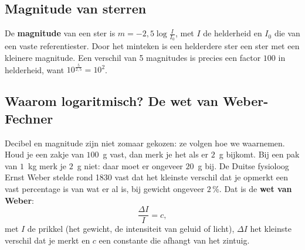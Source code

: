 \subsection{Magnitude van sterren}

De \textbf{magnitude} van een ster is $m = -2{,}5 \log \frac{I}{I_0}$, met $I$ de helderheid en $I_0$ die van een vaste referentiester. Door het minteken is een helderdere ster een ster met een kleinere magnitude. Een verschil van 5 magnitudes is precies een factor $100$ in helderheid, want $10^{\frac{5}{2{,}5}} = 10^2$.


\begin{oefeningen}
\end{oefeningen}

\subsection{Waarom logaritmisch? De wet van Weber-Fechner}

Decibel en magnitude zijn niet zomaar gekozen: ze volgen hoe we waarnemen. Houd je een zakje van $100$~g vast, dan merk je het als er $2$~g bijkomt. Bij een pak van $1$~kg merk je $2$~g niet: daar moet er ongeveer $20$~g bij. De Duitse fysioloog Ernst Weber stelde rond 1830 vast dat het kleinste verschil dat je opmerkt een vast percentage is van wat er al is, bij gewicht ongeveer $2$\,\%. Dat is de \textbf{wet van Weber}:
\[\frac{\Delta I}{I} = c ,\]
met $I$ de prikkel (het gewicht, de intensiteit van geluid of licht), $\Delta I$ het kleinste verschil dat je merkt en $c$ een constante die afhangt van het zintuig.

